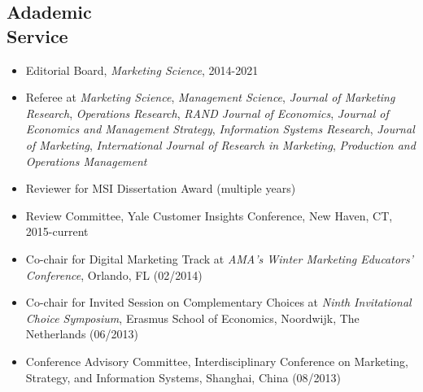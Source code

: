 \documentclass[margin, line, centered, 10pt]{res}
\begin{document}
\begin{resume}
\section{\sc Adademic \\ Service}
\vspace{0.17in}
\begin{itemize}
\item Editorial Board, \textit{Marketing Science}, 2014-2021
\item Referee at \textit{Marketing Science}, \textit{Management Science}, \textit{Journal of Marketing Research}, \textit{Operations Research}, \textit{RAND Journal of Economics}, \textit{Journal of Economics and Management Strategy}, \textit{Information Systems Research}, \textit{Journal of Marketing}, \textit{International Journal of Research in Marketing}, \textit{Production and Operations Management}
\item Reviewer for MSI Dissertation Award (multiple years)
\item Review Committee, Yale Customer Insights Conference, New Haven, CT, 2015-current
\item Co-chair for Digital Marketing Track at \textit{AMA's Winter Marketing Educators' Conference}, Orlando, FL (02/2014)
\item Co-chair for Invited Session on Complementary Choices at \textit{Ninth Invitational Choice Symposium}, Erasmus School of Economics, Noordwijk, The Netherlands (06/2013)
\item Conference Advisory Committee, Interdisciplinary Conference on Marketing, Strategy, and Information Systems, Shanghai, China (08/2013)
\end{itemize}


\end{resume}
\end{document}
